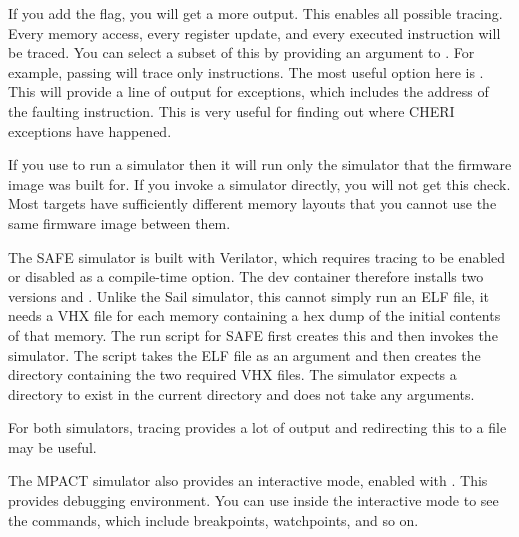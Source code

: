 
If you add the  flag, you will get a  more output.
This enables all possible tracing.
Every memory access, every register update, and every executed instruction will be traced.
You can select a subset of this by providing an argument to .
For example, passing  will trace only instructions.
The most useful option here is .
This will provide a line of output for exceptions, which includes the address of the faulting instruction.
This is very useful for finding out where CHERI exceptions have happened.

\begin{caution}
	If you use  to run a simulator then it will run only the simulator that the firmware image was built for.
	If you invoke a simulator directly, you will not get this check.
	Most targets have sufficiently different memory layouts that you cannot use the same firmware image between them.
\end{caution}

The SAFE simulator is built with Verilator, which requires tracing to be enabled or disabled as a compile-time option.
The dev container therefore installs two versions  and .
Unlike the Sail simulator, this cannot simply run an ELF file, it needs a VHX file for each memory containing a hex dump of the initial contents of that memory.
The run script for SAFE first creates this and then invokes the simulator.
The  script takes the ELF file as an argument and then creates the  directory containing the two required VHX files.
The simulator expects a  directory to exist in the current directory and does not take any arguments.

For both simulators, tracing provides a lot of output and redirecting this to a file may be useful.

The MPACT simulator also provides an interactive mode, enabled with .
This provides debugging environment.
You can use  inside the interactive mode to see the commands, which include breakpoints, watchpoints, and so on.
